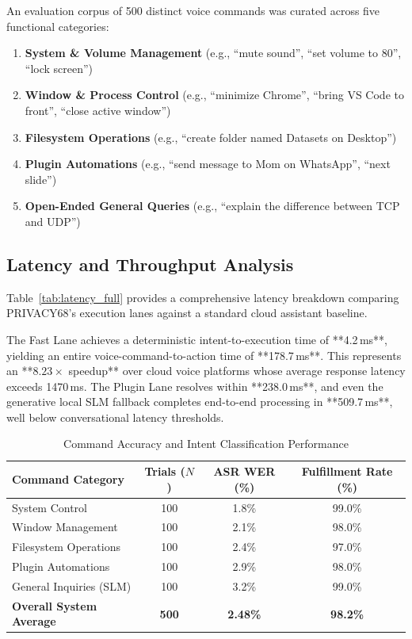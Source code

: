 \documentclass[conference]{IEEEtran}
\begin{document}
An evaluation corpus of 500 distinct voice commands was curated across five functional categories:
\begin{enumerate}
    \item \textbf{System & Volume Management} (e.g., ``mute sound'', ``set volume to 80'', ``lock screen'')
    \item \textbf{Window & Process Control} (e.g., ``minimize Chrome'', ``bring VS Code to front'', ``close active window'')
    \item \textbf{Filesystem Operations} (e.g., ``create folder named Datasets on Desktop'')
    \item \textbf{Plugin Automations} (e.g., ``send message to Mom on WhatsApp'', ``next slide'')
    \item \textbf{Open-Ended General Queries} (e.g., ``explain the difference between TCP and UDP'')
\end{enumerate}

\subsection{Latency and Throughput Analysis}
Table~\ref{tab:latency_full} provides a comprehensive latency breakdown comparing PRIVACY68's execution lanes against a standard cloud assistant baseline. 

The Fast Lane achieves a deterministic intent-to-execution time of **4.2\,ms**, yielding an entire voice-command-to-action time of **178.7\,ms**. This represents an **$8.23\times$ speedup** over cloud voice platforms whose average response latency exceeds 1470\,ms. The Plugin Lane resolves within **238.0\,ms**, and even the generative local SLM fallback completes end-to-end processing in **509.7\,ms**, well below conversational latency thresholds.

\begin{table}[htbp]
\caption{Command Accuracy and Intent Classification Performance}
\label{tab:accuracy}
\centering
\begin{tabular}{@{}lccc@{}}
\toprule
\textbf{Command Category} & \textbf{Trials ($N$)} & \textbf{ASR WER (\%)} & \textbf{Fulfillment Rate (\%)} \\
\midrule
System Control & 100 & 1.8\% & 99.0\% \\
Window Management & 100 & 2.1\% & 98.0\% \\
Filesystem Operations & 100 & 2.4\% & 97.0\% \\
Plugin Automations & 100 & 2.9\% & 98.0\% \\
General Inquiries (SLM) & 100 & 3.2\% & 99.0\% \\
\midrule
\textbf{Overall System Average} & \textbf{500} & \textbf{2.48\%} & \textbf{98.2\%} \\
\bottomrule
\end{tabular}
\end{table}
\end{document}
